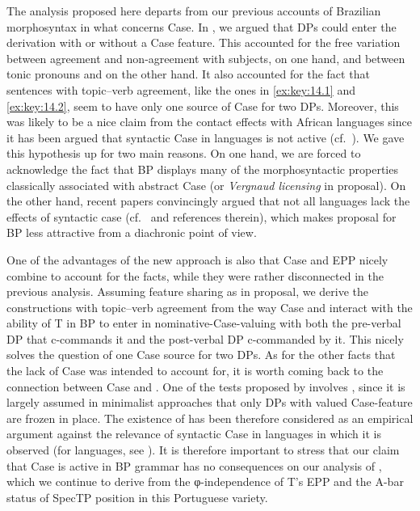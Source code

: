 \documentclass[output=paper]{langsci/langscibook}
\begin{document}
The analysis proposed here departs from our previous accounts of Brazilian
mor\-pho\-syn\-tax in what concerns Case. In
\textcite{AvelarGalves2011,AvelarGalves2016}, we argued that DPs could enter
the derivation with or without a Case feature. This accounted for the free
variation between agreement and non-agreement with subjects, on one hand, and
between tonic pronouns and  on the other hand. It also accounted for the
fact that sentences with topic--verb agreement, like the ones in
\eqref{ex:key:14.1} and \eqref{ex:key:14.2}, seem to have only one source of
Case for two DPs.  Moreover, this was likely to be a nice claim from the
contact effects with African languages since it has been argued that syntactic
Case in  languages is not active (cf.\ \citealt{Diercks2012}). We gave
this hypothesis up for two main reasons. On one hand, we are forced to
acknowledge the fact that BP displays many of the morphosyntactic properties
classically associated with abstract Case (or \emph{Vergnaud licensing} in
 proposal).  On the other hand, recent
papers convincingly argued that not all  languages lack the effects of
syntactic case (cf.\ \citealt{vanderWal2015} and references therein), which
makes  proposal for \gls{BP} less attractive
from a diachronic point of view.

One of the advantages of the new approach is also that Case and \gls{EPP}
nicely combine to account for the facts, while they were rather disconnected in
the previous analysis. Assuming feature sharing as in 
proposal, we derive the constructions with topic--verb agreement from the way
Case and  interact with the ability of T in BP to enter in
nominative-Case-valuing with both the pre-verbal DP that c-commands it and the
post-verbal DP c-commanded by it.  This nicely solves the question of one Case
source for two DPs.  As for the other facts that the lack of Case was intended
to account for, it is worth coming back to the connection between Case and
. One of the tests proposed by \citet{SheevanderWal2018} involves
, since it is largely assumed in minimalist approaches that only
DPs with valued Case-feature are frozen in place. The existence of
 has been therefore considered as an empirical argument against
the relevance of syntactic Case in languages in which it is observed (for 
languages, see \citealt{Diercks2012}). It is therefore important to stress that
our claim that Case is active in \gls{BP} grammar has
no consequences on our analysis of , which we continue to derive
from the φ-independence of T’s \gls{EPP} and the A-bar status of SpecTP
position in this Portuguese variety.
\end{document}
